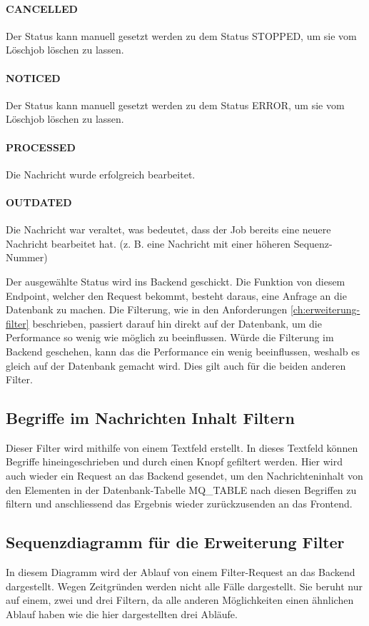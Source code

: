 \paragraph{CANCELLED} Der Status kann manuell gesetzt werden zu dem Status STOPPED, um sie vom Löschjob löschen zu lassen.
\paragraph{NOTICED} Der Status kann manuell gesetzt werden zu dem Status ERROR, um sie vom Löschjob löschen zu lassen.
\paragraph{PROCESSED} Die Nachricht wurde erfolgreich bearbeitet.
\paragraph{OUTDATED} Die Nachricht war veraltet, was bedeutet, dass der Job bereits eine neuere Nachricht bearbeitet hat. (z. B. eine Nachricht mit einer höheren Sequenz-Nummer)\newline

\noindent Der ausgewählte Status wird ins Backend geschickt. Die Funktion von diesem Endpoint, welcher den Request bekommt, besteht daraus, eine Anfrage an die Datenbank zu machen. Die Filterung, wie in den Anforderungen \ref{ch:erweiterung-filter} beschrieben, passiert darauf hin direkt auf der Datenbank, um die Performance so wenig wie möglich zu beeinflussen. Würde die Filterung im Backend geschehen, kann das die Performance ein wenig beeinflussen, weshalb es gleich auf der Datenbank gemacht wird. Dies gilt auch für die beiden anderen Filter.

\subsection{Begriffe im Nachrichten Inhalt Filtern}
Dieser Filter wird mithilfe von einem Textfeld erstellt. In dieses Textfeld können Begriffe hineingeschrieben und durch einen Knopf gefiltert werden. Hier wird auch wieder ein Request an das Backend gesendet, um den Nachrichteninhalt von den Elementen in der Datenbank-Tabelle MQ\_TABLE nach diesen Begriffen zu filtern und anschliessend das Ergebnis wieder zurückzusenden an das Frontend.

\subsection{Sequenzdiagramm für die Erweiterung Filter}
In diesem Diagramm wird der Ablauf von einem Filter-Request an das Backend dargestellt. Wegen Zeitgründen werden nicht alle Fälle dargestellt. Sie beruht nur auf einem, zwei und drei Filtern, da alle anderen Möglichkeiten einen ähnlichen Ablauf haben wie die hier dargestellten drei Abläufe.

